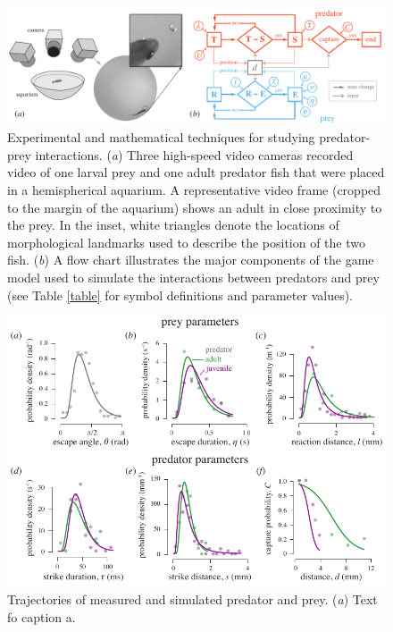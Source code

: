 \documentclass[]{rsos}%
\begin{document}
\pagebreak

\linespread{1}\selectfont %


\begin{figure}[!h]
\centering
	\includegraphics[width=5.5in]{fig_setup}
\caption{Experimental and mathematical techniques for studying predator-prey interactions. 
(\textit{a}) Three high-speed video cameras recorded video of one larval prey and one adult predator fish that were placed in a hemispherical aquarium. 
A representative video frame (cropped to the margin of the aquarium) shows an adult in close proximity to the prey. 
In the inset, white triangles denote the locations of morphological landmarks used to describe the position of the two fish.
 (\textit{b}) A flow chart illustrates the major components of the game model used to simulate the interactions between predators and prey (see Table \ref{table} for symbol definitions and parameter values).}
\label{fig_setup}
\end{figure}

\pagebreak

\begin{figure}[!h]
\centering
	\includegraphics[width=5.5in]{fig_PDFs}
\caption{Trajectories of measured and simulated predator and prey. 
(\textit{a}) Text fo caption a.}
\label{fig_PDF}
\end{figure}
\end{document}
